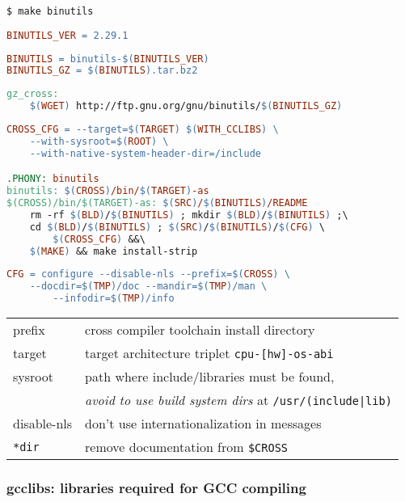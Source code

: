 \begin{lstlisting}
$ make binutils
\end{lstlisting}
\begin{lstlisting}[language=make,title=mk/version]
BINUTILS_VER = 2.29.1
\end{lstlisting}
\begin{lstlisting}[language=make,title=mk/package]
BINUTILS = binutils-$(BINUTILS_VER)
BINUTILS_GZ = $(BINUTILS).tar.bz2
\end{lstlisting}
\begin{lstlisting}[language=make,title=mk/gz]
gz_cross:
	$(WGET) http://ftp.gnu.org/gnu/binutils/$(BINUTILS_GZ)
\end{lstlisting}
\begin{lstlisting}[language=make,title=mk/cross]
CROSS_CFG = --target=$(TARGET) $(WITH_CCLIBS) \
	--with-sysroot=$(ROOT) \
	--with-native-system-header-dir=/include  

.PHONY: binutils
binutils: $(CROSS)/bin/$(TARGET)-as
$(CROSS)/bin/$(TARGET)-as: $(SRC)/$(BINUTILS)/README
	rm -rf $(BLD)/$(BINUTILS) ; mkdir $(BLD)/$(BINUTILS) ;\
	cd $(BLD)/$(BINUTILS) ; $(SRC)/$(BINUTILS)/$(CFG) \
		$(CROSS_CFG) &&\
	$(MAKE) && make install-strip
\end{lstlisting}
\begin{lstlisting}[language=make,title=mk/cfg]
CFG = configure --disable-nls --prefix=$(CROSS) \
	--docdir=$(TMP)/doc --mandir=$(TMP)/man \
		--infodir=$(TMP)/info
\end{lstlisting}

\begin{tabular}{l l}
prefix & cross compiler toolchain install directory\\
target & target architecture triplet \verb|cpu-[hw]-os-abi| \\
sysroot & path where include/libraries must be found,\\
& \emph{avoid to use build system dirs} at \verb$/usr/(include|lib)$\\
\hline
disable-nls & don't use internationalization in messages \\
\verb$*dir$ & remove documentation from \verb|$CROSS|\\
\end{tabular}

\subsubsection{gcclibs: libraries required for GCC compiling}

